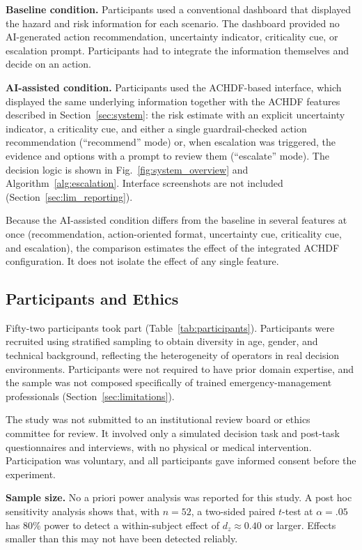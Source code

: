 \documentclass[journal]{IEEEtran}
\theoremstyle{plain}
\theoremstyle{definition}
\begin{document}
    \textbf{Baseline condition.} Participants used a conventional dashboard that displayed the hazard and risk information for each scenario. The dashboard provided no AI-generated action recommendation, uncertainty indicator, criticality cue, or escalation prompt. Participants had to integrate the information themselves and decide on an action.

    \textbf{AI-assisted condition.} Participants used the ACHDF-based interface, which displayed the same underlying information together with the ACHDF features described in Section~\ref{sec:system}: the risk estimate with an explicit uncertainty indicator, a criticality cue, and either a single guardrail-checked action recommendation (``recommend'' mode) or, when escalation was triggered, the evidence and options with a prompt to review them (``escalate'' mode). The decision logic is shown in Fig.~\ref{fig:system_overview} and Algorithm~\ref{alg:escalation}. Interface screenshots are not included (Section~\ref{sec:lim_reporting}).

    Because the AI-assisted condition differs from the baseline in several features at once (recommendation, action-oriented format, uncertainty cue, criticality cue, and escalation), the comparison estimates the effect of the integrated ACHDF configuration. It does not isolate the effect of any single feature.

    \subsection{Participants and Ethics}
    \label{sec:participants}

    Fifty-two participants took part (Table~\ref{tab:participants}). Participants were recruited using stratified sampling to obtain diversity in age, gender, and technical background, reflecting the heterogeneity of operators in real decision environments. Participants were not required to have prior domain expertise, and the sample was not composed specifically of trained emergency-management professionals (Section~\ref{sec:limitations}).

    The study was not submitted to an institutional review board or ethics committee for review. It involved only a simulated decision task and post-task questionnaires and interviews, with no physical or medical intervention. Participation was voluntary, and all participants gave informed consent before the experiment.

    \textbf{Sample size.} No a priori power analysis was reported for this study. A post hoc sensitivity analysis shows that, with $n=52$, a two-sided paired $t$-test at $\alpha=.05$ has 80\% power to detect a within-subject effect of $d_z \approx 0.40$ or larger. Effects smaller than this may not have been detected reliably.
\end{document}
